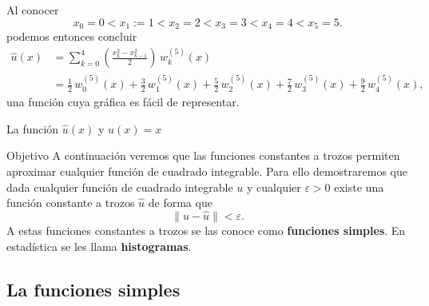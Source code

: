 \documentclass[10pt,handout]{beamer}
\theoremstyle{plain} %
\theoremstyle{plain} %
\theoremstyle{plain} %
\theoremstyle{plain} %
\theoremstyle{definition}
\theoremstyle{example}
\theoremstyle{example}
\theoremstyle{remark}
\theoremstyle{remark}
\begin{document}
\begin{frame}
Al conocer
$$
x_0=0 < x_1:= 1 < x_2 = 2 < x_3=3 < x_4= 4 < x_5 = 5.
$$
podemos entonces concluir
\begin{align*}
\widehat{u}(x) & = \sum_{k=0}^4 \left( \frac{x_k^2-x_{k-1}^2}{2}\right) \, w_k^{(5)}(x) \\ 
& = \frac{1}{2}\, w_0^{(5)}(x) +  \frac{3}{2}\,w_1^{(5)}(x) +  \frac{5}{2}\,w_2^{(5)}(x) +  \frac{7}{2}\,w_3^{(5)}(x) +  \frac{9}{2}\, w_4^{(5)}(x),
\end{align*}
una función cuya gráfica es fácil de representar.
\end{frame}

\begin{frame}{La función $\widehat{u}(x)$ y $u(x)=x$}
\end{frame}

\begin{frame}
\begin{block}{Objetivo}
A continuación veremos que las funciones constantes a trozos 
permiten aproximar cualquier función de cuadrado integrable. Para ello demostraremos 
que dada cualquier función de cuadrado integrable $u$ y cualquier $\varepsilon > 0$ existe
una función constante a trozos $\widehat{u}$ de forma que 
$$
\|u-\widehat{u}\| < \varepsilon.
$$
A estas funciones constantes a trozos se las conoce como \textbf{funciones simples}. En estadística se les llama \textbf{histogramas}.
\end{block}
\end{frame}

\subsection{La funciones simples}
\end{document}
